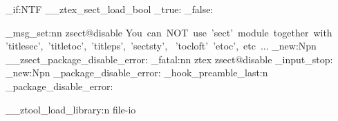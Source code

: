 



\bool_if:NTF \g__ztex_sect_load_bool 
  { \if_true:  }
  { \if_false: }


\ztex_msg_set:nn { zsect@disable }
  {
    You~can~NOT~use~'sect'~module~together~with~
    'titlesec',~'titletoc',~'titleps',~'sectsty',~
    'tocloft'~'etoc',~etc~...
  }
\cs_new:Npn \__zsect_package_disable_error:
  {
    \msg_fatal:nn { ztex } { zsect@disable }
    \ExplSyntaxOff
    \file_input_stop:
  }
\cs_new:Npn \zsect_package_disable_error:
  {
  }
\ztex_hook_preamble_last:n 
  {
    \zsect_package_disable_error:
  }



\__ztool_load_library:n { file-io }

